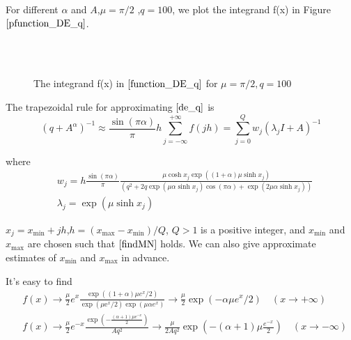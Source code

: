 For different $\alpha$ and $A$,$\mu=\pi/2$ ,$q=100$, we plot the integrand f(x) in Figure $\ref{pfunction_DE_q}$.
\begin{figure}[htbp]
	\centering
	~~
	~~
	~~
	\\                 
	~~
	~~
	~~
	\caption{The integrand f(x) in $\eqref{function_DE_q}$ for $\mu=\pi/2,q=100$}
	\label{pfunction_DE_q}
\end{figure}

The trapezoidal rule for approximating $\eqref{de_q} $ is
\begin{equation}
	(q+{A}^{\alpha})^{-1}\approx \frac{\sin(\pi \alpha)}{\pi} h\sum_{j=-\infty}^{+\infty} f(jh)=\sum_{j=0}^{Q}w_j(\lambda_jI+A)^{-1}
	\label{DE_q}
\end{equation}

where
\begin{equation}
	\begin{aligned}
		&w_j=h\frac{\sin(\pi \alpha)}{\pi}\frac{\mu\cosh x_j\exp((1+\alpha)\mu\sinh x_j )}{(q^2+2q\exp(\mu \alpha \sinh x_j)\cos(\pi\alpha)+\exp(2\mu\alpha\sinh x_j))}\\
		&\lambda_j=\exp(\mu\sinh x_j)
	\end{aligned}
\label{lw_DE_q}
\end{equation}

$x_j=x_{\min}+jh$,$h=(x_{\max}-x_{\min})/Q$, $Q>1$ is a positive integer, and $x_{\min}$ and $x_{\max}$ are chosen such that $\eqref{findMN}$ holds. We can also give approximate estimates of $x_{\min}$ and $x_{\max}$ in advance.

It's easy to find
\begin{equation}
	\begin{aligned}
		& f\left( x \right) \rightarrow
		\frac{\mu}{2}e^x\frac{\exp \left( \left( 1+\alpha \right) \mu e^x/2 \right)}{\exp \left( \mu \text{e}^x/2 \right)\exp(\mu \alpha e^x)}
		\rightarrow \frac{\mu}{2}\exp \left(  -\alpha \mu e^x /2\right)
		\quad (x \rightarrow +\infty)\\
		& f\left( x \right) \rightarrow 	 \frac{\mu}{2} e^{-x} \frac{\exp \left(-\frac{(\alpha+1)\mu e^{-x}}{2}\right)}{Aq^2} \rightarrow
		\frac{\mu}{2 Aq^2}  \exp \left(-(\alpha+1)\mu \frac{e^{-x}}{2}\right)
		\quad (x \rightarrow -\infty)\\
	\end{aligned}
	\label{AS_DE}
\end{equation}

